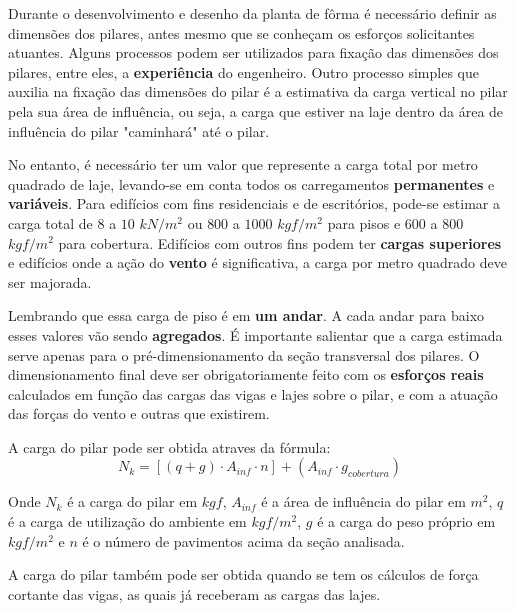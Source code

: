 Durante o desenvolvimento e desenho da planta de fôrma é necessário definir as dimensões dos pilares, antes mesmo que se conheçam os esforços solicitantes atuantes. Alguns processos podem ser utilizados para fixação das dimensões dos pilares, entre eles, a \textbf{experiência} do engenheiro. Outro processo simples que auxilia na fixação das dimensões do pilar é a estimativa da carga vertical no pilar pela sua área de influência, ou seja, a carga que estiver na laje dentro da área de influência do pilar "caminhará" até o pilar.

No entanto, é necessário ter um valor que represente a carga total por metro quadrado de laje, levando-se em conta todos os carregamentos \textbf{permanentes} e \textbf{variáveis}. Para edifícios com fins residenciais e de escritórios, pode-se estimar a carga total de \textbf{$8$} a $10$ $kN/m^2$ ou $800$ a $1000$ $kgf/m^2$ para pisos e $600$ a $800$ $kgf/m^2$ para cobertura. Edifícios com outros fins podem ter \textbf{cargas superiores} e edifícios onde a ação do \textbf{vento} é significativa, a carga por metro quadrado deve ser majorada.

Lembrando que essa carga de piso é em \textbf{um andar}. A cada andar para baixo esses valores vão sendo \textbf{agregados}. É importante salientar que a carga estimada serve apenas para o pré-dimensionamento da seção transversal dos pilares. O dimensionamento final deve ser obrigatoriamente feito com os \textbf{esforços reais} calculados em função das cargas das vigas e lajes sobre o pilar, e com a atuação das forças do vento e outras que existirem.

A carga do pilar pode ser obtida atraves da fórmula: $$N_k=[(q+g)\cdot A_{inf}\cdot n]+(A_{inf}\cdot g_{cobertura})$$

Onde $N_k$ é a carga do pilar em $kgf$, $A_{inf}$ é a área de influência do pilar em $m^2$, $q$ é a carga de utilização do ambiente em $kgf/m^2$, $g$ é a carga do peso próprio em $kgf/m^2$ e $n$ é o número de pavimentos acima da seção analisada.

A carga do pilar também pode ser obtida quando se tem os cálculos de força cortante das vigas, as quais já receberam as cargas das lajes.